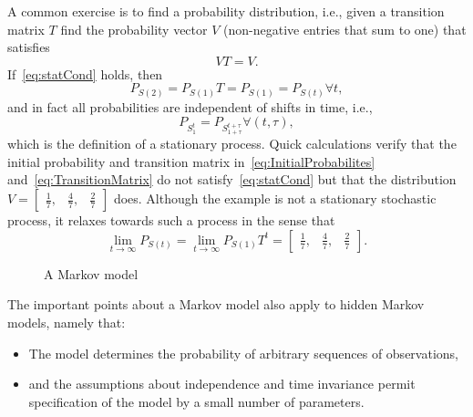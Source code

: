 \documentclass[]{article}
\newcommand{\ts}[3]{#1_{#2}^{#3}}                    %
\newcommand{\ti}[2]{{#1}{(#2)}}                  %
\newcommand{\ie}{i.e.\xspace}
\newcommand{\plotsize}{%
  \fontsize{9}{9}%
  \selectfont}
\renewcommand{\comment}[1]{}
\newcommand*{\inputfig}[2]{}
\newcommand*{\InputIntroductionFig}[1]{\inputfig{../../figs/introduction}{#1}}
\begin{document}
A common exercise is to find a \emph{} probability
distribution, \ie, given a transition matrix $T$ find the probability
vector $V$ (non-negative entries that sum to one) that satisfies
\begin{equation}
  \label{eq:statCond}
  VT = V.
\end{equation}
If~\eqref{eq:statCond} holds, then
\begin{equation*}
  P_{\ti{S}{2}}  = P_{\ti{S}{1}}T = P_{\ti{S}{1}} = P_{\ti{S}{t}}
  \forall t,
\end{equation*}
and in fact all probabilities are independent of shifts in time, \ie,
\begin{equation*}
  P_{\ts{S}{1}{t}} = P_{\ts{S}{1+\tau}{t+\tau}} \forall (t,\tau),
\end{equation*}
which is the definition of a stationary process.  Quick calculations
verify that the initial probability and transition matrix
in~\eqref{eq:InitialProbabilites} and~\eqref{eq:TransitionMatrix} do
not satisfy~\eqref{eq:statCond} but that the distribution $V =
\begin{bmatrix} \frac{1}{7}, & \frac{4}{7}, & \frac{2}{7}
\end{bmatrix}$ does.  Although the example is not a stationary
stochastic process, it relaxes towards such a process in the sense
that
\begin{equation*}
  \lim_{t \rightarrow \infty} P_{\ti{S}{t}} =  \lim_{t \rightarrow
    \infty} P_{\ti{S}{1}} T^t = \begin{bmatrix} \frac{1}{7}, & \frac{4}{7}, & \frac{2}{7}
\end{bmatrix}.
\end{equation*}

\begin{figure}[htbp]
  \centering{\plotsize%
    \InputIntroductionFig{Markov_mm}
  }
  \caption[\comment{fig:Markov }A Markov model.]{A Markov model}\label{fig:mm}
\end{figure}

The important points about a Markov model also apply to hidden
Markov models, namely that:
\begin{itemize}
\item The model determines the probability of arbitrary sequences of
  observations,
\item and the assumptions about independence and time invariance
  permit specification of the model by a small number of parameters.
\end{itemize}
\end{document}
